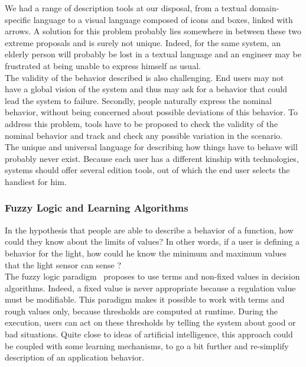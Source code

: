 We had a range of description tools at our disposal, from a textual domain-specific language to a visual language composed of icons and boxes, linked with arrows. A solution for this problem probably lies somewhere in between these two extreme proposals and is surely not unique. Indeed, for the same system, an elderly person will probably be lost in a textual language and an engineer may be frustrated at being unable to express himself as usual.\\

The validity of the behavior described is also challenging. End users may not have a global vision of the system and thus may ask for a behavior that could lead the system to failure. Secondly, people naturally express the nominal behavior, without being concerned about possible deviations of this behavior. To address this problem, tools have to be proposed to check the validity of the nominal behavior and track and check any possible variation in the scenario.\\

The unique and universal language for describing how things have to behave will probably never exist. Because each user has a different kinship with technologies, systems should offer several edition tools, out of which the end user selects the handiest for him.


\subsubsection{Fuzzy Logic and Learning Algorithms}

In the hypothesis that people are able to describe a behavior of a function, how could they know about the limits of values? In other words, if a user is defining a behavior for the light, how could he know the minimum and maximum values that the light sensor can sense ?\\
The fuzzy logic paradigm~\cite{Chauvel:2008,Mendel:2001} proposes to use terms and non-fixed values in decision algorithms. Indeed, a fixed value is never appropriate because a regulation value must be modifiable. This paradigm makes it possible to work with terms and rough values only, because thresholds are computed at runtime. During the execution, users can act on these thresholds by telling the system about good or bad situations. Quite close to ideas of artificial intelligence, this approach could be coupled with some learning mechanisms, to go a bit further and re-simplify description of an application behavior.

